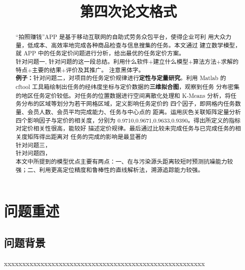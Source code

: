 \documentclass{whutmod}
\title{第四次论文格式}
\begin{document}
	
	\begin{abstract}
“拍照赚钱”APP 是基于移动互联网的自助式劳务众包平台，使得企业可利 用大众力量，低成本、高效率地完成各种商品检查与信息搜集的任务。本文通过 建立数学模型，就 APP 中的任务定价问题进行分析，给出最优的任务定价方案。
   ~\\%
   
针对问题一, 针对问题的这一段总结。利用什么软件+建立什么模型+算法方法+求解的特点+主要的结果+评价及其推广。  注意黑体字。
~\\

\textbf{例子：}针对问题二，对项目的任务定价规律进行\textbf{定性与定量研究}。利用 Matlab 的 cftool 工具箱绘制出任务的经纬度坐标与定价数据的\textbf{三维拟合图}，观察到任务 分布密集的地区任务定价较低。对任务的位置数据进行空间离散化处理和 K-Means 分析，将任务分布的区域等划分为若干网格区域，定义影响任务定价的 四个因子，即网格内任务数量、会员人数、会员平均完成能力、任务与中心点的 距离。运用灰色关联矩阵定量分析四个影响因子与定价的相关度，分别为 0.9710,0.9671,0.9633,0.9390。得出所定义的指标对定价相关性很高，能较好 描述定价规律。最后通过比较未完成任务与已完成任务的相关度矩阵得出距离对 任务的完成的影响是最显著的
   ~\\

针对问题三，
   ~\\
   
针对问题四，
   ~\\

本文中所提到的模型优点主要有两点：一、在与污染源头距离较短时预测抗噪能力较强；二、利用更高定位精度和鲁棒性的直线解析法，溯源追踪能力较强。
  
		
	\end{abstract}
	
	\tableofcontents
	\newpage	%
	
	\section{问题重述}
	\subsection{问题背景}
xxxxxxxxxxxxxxxxxxxxxxxxxxxxxxxxxxxxxxxxxxxxxxxxxxxxxxx
	
\end{document}
